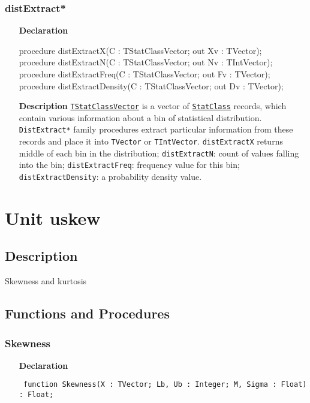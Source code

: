 \documentclass[12pt,a4paper,oneside]{report}
\newcommand{\lmatha}[1]{   %
	\marginpar{\vspace{#1} 
		\begin{flushright}
			LMath 0.5
	\end{flushright} }
}
\newcommand{\declarationitem}[1]{\textbf{#1}}
\newcommand{\descriptiontitle}[1]{\textbf{#1}}
\newcommand{\code}[1]{\texttt{#1}}
\begin{document}
\subsubsection{distExtract*}\lmatha{-24pt}
\label{udistrib-distExtract}
\begin{itemize}
	\item[\declarationitem{Declaration}\hfill]
	\begin{flushleft}
procedure distExtractX(C : TStatClassVector; out Xv : TVector);\\
procedure distExtractN(C : TStatClassVector; out Nv : TIntVector);\\
procedure distExtractFreq(C : TStatClassVector; out Fv : TVector);\\
procedure distExtractDensity(C : TStatClassVector; out Dv : TVector);
	\end{flushleft}
	\item[\descriptiontitle{Description}]
	\hyperref[utypes-TStatClassVector]{\code{TStatClassVector}} is a vector of \hyperref[sec:statclass]{\code{StatClass}} records, which contain various information about a bin of statistical distribution.
	\code{DistExtract*} family procedures extract particular information from these records and place it into \code{TVector} or \code{TIntVector}. \code{distExtractX} returns middle of each bin in the distribution; \code{distExtractN}: count of values falling into the bin; \code{distExtractFreq}: frequency value for this bin; \code{distExtractDensity}: a probability density value.
\end{itemize}	
\section{Unit uskew}
\label{uskew}
\subsection{Description}
Skewness and kurtosis
\subsection{Functions and Procedures}
\subsubsection{Skewness}
\label{uskew-Skewness}
\begin{itemize}\item[\declarationitem{Declaration}\hfill]
	\begin{flushleft}
		\code{
			function Skewness(X : TVector; Lb, Ub : Integer; M, Sigma : Float) : Float;}
	\end{flushleft}
\end{itemize}
\end{document}
